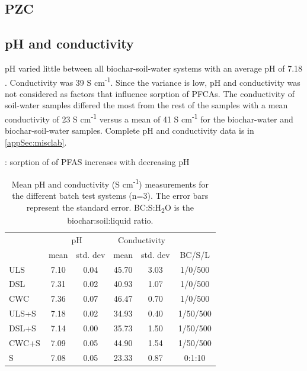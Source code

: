 \subsection{PZC}

\subsection{pH and conductivity}
pH varied little between all biochar-soil-water systems with an average pH of 7.18 . Conductivity was 39  \textmu S cm\textsuperscript{-1}. Since the variance is low, pH and conductivity was not considered as factors that influence sorption of PFCAs. The conductivity of soil-water samples differed the most from the rest of the samples with a mean conductivity of 23  \textmu S cm\textsuperscript{-1} versus a mean of 41  \textmu S cm\textsuperscript{-1} for the biochar-water and biochar-soil-water samples. Complete pH and conductivity data is in \cref{appSec:misclab}.

\citep{zhang2013sorption}: sorption of of PFAS increases with decreasing pH

\begin{table}
\centering
\caption{Mean pH and conductivity (\textmu S cm\textsuperscript{-1}) measurements for the different batch test systems (n=3). The error bars represent the standard error. BC:S:H\textsubscript{2}O is the biochar:soil:liquid ratio.}
\label{tab:pHcond}
\begin{tabular}{lccccc}
\toprule
 & \multicolumn{2}{c}{pH} & \multicolumn{2}{c}{Conductivity} & \\ \cline{2-5}
 & mean & std. dev & mean & std. dev & BC/S/L\\ 
\midrule
ULS & 7.10 & 0.04 & 45.70 & 3.03 & 1/0/500\\
DSL & 7.31 & 0.02 & 40.93 & 1.07 & 1/0/500\\
CWC & 7.36 & 0.07 & 46.47 & 0.70 & 1/0/500\\
ULS+S & 7.18 & 0.02 & 34.93 & 0.40 & 1/50/500\\
DSL+S & 7.14 & 0.00 & 35.73 & 1.50 & 1/50/500\\
CWC+S & 7.09 & 0.05 & 44.90 & 1.54 & 1/50/500\\
S & 7.08 & 0.05 & 23.33 & 0.87 & 0:1:10\\
\bottomrule
\end{tabular}
\end{table}



